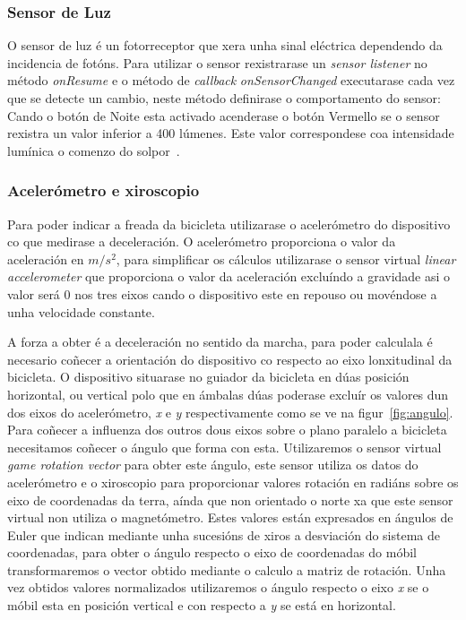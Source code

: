 \subsubsection{Sensor de Luz}
O sensor de luz é un fotorreceptor que xera unha sinal eléctrica dependendo da incidencia de fotóns. Para utilizar o sensor rexistrarase un \emph{sensor listener} no método \emph{onResume} e o método de \emph{callback} \emph{onSensorChanged} executarase cada vez que se detecte un cambio, neste método definirase o comportamento do sensor: Cando o botón de Noite esta activado acenderase o botón Vermello se o sensor rexistra un valor inferior a 400 lúmenes. Este valor correspondese coa intensidade lumínica o comenzo do solpor~\cite{Lux2019}.

\subsubsection{Acelerómetro e xiroscopio}
Para poder indicar a freada da bicicleta utilizarase o acelerómetro do dispositivo co que medirase a deceleración. O acelerómetro proporciona o valor da aceleración en $m/s^2$, para simplificar os cálculos utilizarase o sensor virtual \emph{ linear accelerometer} que proporciona o valor da aceleración excluíndo a gravidade asi o valor será 0 nos tres eixos cando o dispositivo este en repouso ou movéndose a unha velocidade constante.

A forza a obter é a deceleración no sentido da marcha, para poder calculala é necesario coñecer a orientación do dispositivo co respecto ao eixo lonxitudinal da bicicleta. O dispositivo situarase no guiador da bicicleta en dúas posición horizontal, ou vertical polo que en ámbalas dúas poderase excluír os valores dun dos eixos do acelerómetro, \emph{x} e \emph{y} respectivamente como se ve na figur~\ref{fig:angulo}. Para coñecer a influenza dos outros dous eixos sobre o plano paralelo a bicicleta necesitamos coñecer o ángulo que forma con esta. Utilizaremos o sensor virtual \emph{game rotation vector} para obter este ángulo, este sensor utiliza os datos do acelerómetro e o xiroscopio para proporcionar valores rotación en radiáns sobre os eixo de coordenadas da terra, aínda que non orientado o norte xa que este sensor virtual non utiliza o magnetómetro.  Estes valores están expresados en ángulos de Euler que indican mediante unha sucesións de xiros a desviación do sistema de coordenadas, para obter o ángulo respecto o eixo de coordenadas do móbil transformaremos o vector obtido mediante o calculo a matriz de rotación. Unha vez obtidos valores normalizados utilizaremos o ángulo respecto o eixo \emph{x} se o móbil esta en posición vertical e con respecto a \emph{y} se está en horizontal.

